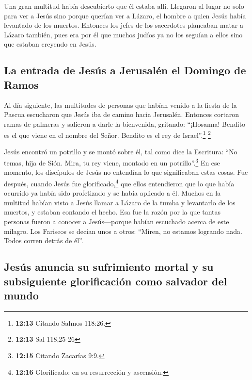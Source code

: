  Una gran multitud había descubierto que él estaba allí.
Llegaron al lugar no solo para ver a Jesús sino porque querían ver a
Lázaro, el hombre a quien Jesús había levantado de los muertos.
 Entonces los jefes de los sacerdotes planeaban matar a
Lázaro también,  pues era por él que muchos judíos ya no
los seguían a ellos sino que estaban creyendo en Jesús.

\hypertarget{la-entrada-de-jesuxfas-a-jerusaluxe9n-el-domingo-de-ramos}{%
\subsection{La entrada de Jesús a Jerusalén el Domingo de
Ramos}\label{la-entrada-de-jesuxfas-a-jerusaluxe9n-el-domingo-de-ramos}}

 Al día siguiente, las multitudes de personas que habían
venido a la fiesta de la Pascua escucharon que Jesús iba de camino hacia
Jerusalén.  Entonces cortaron ramas de palmeras y
salieron a darle la bienvenida, gritando: ``¡Hosanna! Bendito es el que
viene en el nombre del Señor. Bendito es el rey de Israel''.\footnote{\textbf{12:13}
  Citando Salmos 118:26.} \footnote{\textbf{12:13} Sal 118,25-26}

 Jesús encontró un potrillo y se montó sobre él, tal como
dice la Escritura:  ``No temas, hija de Sión. Mira, tu
rey viene, montado en un potrillo''.\footnote{\textbf{12:15} Citando
  Zacarías 9:9.}  En ese momento, los discípulos de Jesús
no entendían lo que significaban estas cosas. Fue después, cuando Jesús
fue glorificado,\footnote{\textbf{12:16} Glorificado: en su resurrección
  y ascensión.} que ellos entendieron que lo que había ocurrido ya había
sido profetizado y se había aplicado a él.  Muchos en la
multitud habían visto a Jesús llamar a Lázaro de la tumba y levantarlo
de los muertos, y estaban contando el hecho.  Esa fue la
razón por la que tantas personas fueron a conocer a Jesús---porque
habían escuchado acerca de este milagro.  Los Fariseos se
decían unos a otros: ``Miren, no estamos logrando nada. Todos corren
detrás de él''.

\hypertarget{jesuxfas-anuncia-su-sufrimiento-mortal-y-su-subsiguiente-glorificaciuxf3n-como-salvador-del-mundo}{%
\subsection{Jesús anuncia su sufrimiento mortal y su subsiguiente
glorificación como salvador del
mundo}\label{jesuxfas-anuncia-su-sufrimiento-mortal-y-su-subsiguiente-glorificaciuxf3n-como-salvador-del-mundo}}

